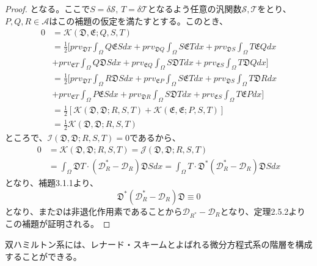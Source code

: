 \documentclass[a4paper, 11pt]{report}
\theoremstyle{definition}
\begin{document}
\begin{proof}
となる。ここで$S=\delta\mathcal{S}, \, T=\delta\mathcal{T}$となるよう任意の汎関数$\mathcal{S},\mathcal{T}$をとり、$P,Q,R\in\mathcal{A}$はこの補題の仮定を満たすとする。このとき、
\begin{align*}
0 &= \mathcal{K}(\mathfrak{D},\mathfrak{E};Q,S,T)\\
&= \frac{1}{2}[prv_{\mathfrak{D}T}\int_\Omega Q\mathfrak{E}Sdx + prv_{\mathfrak{D}Q}\int_\Omega S\mathfrak{E}Tdx + prv_{\mathfrak{D}S}\int_\Omega T\mathfrak{E}Qdx\\
&+ prv_{\mathfrak{E}T}\int_\Omega Q\mathfrak{D}Sdx + prv_{\mathfrak{E}Q}\int_\Omega S\mathfrak{D}Tdx + prv_{\mathfrak{E}S}\int_\Omega T\mathfrak{D}Qdx]\\
&= \frac{1}{2}[prv_{\mathfrak{D}T}\int_\Omega R\mathfrak{D}Sdx + prv_{\mathfrak{E}P}\int_\Omega S\mathfrak{E}Tdx + prv_{\mathfrak{D}S}\int_\Omega T\mathfrak{D}Rdx\\
&+ prv_{\mathfrak{E}T}\int_\Omega P\mathfrak{E}Sdx + prv_{\mathfrak{D}R}\int_\Omega S\mathfrak{D}Tdx + prv_{\mathfrak{E}S}\int_\Omega T\mathfrak{E}Pdx]\\
&= \frac{1}{2}[\mathcal{K}(\mathfrak{D},\mathfrak{D};R,S,T)+\mathcal{K}(\mathfrak{E},\mathfrak{E};P,S,T)]\\
&= \frac{1}{2}\mathcal{K}(\mathfrak{D},\mathfrak{D};R,S,T)
\end{align*}
ところで、$\mathcal{I}(\mathfrak{D},\mathfrak{D};R,S,T)=0$であるから、
\begin{align*}
0 &= \mathcal{K}(\mathfrak{D},\mathfrak{D};R,S,T) = \mathcal{J}(\mathfrak{D},\mathfrak{D};R,S,T)\\
&= \int_\Omega \mathfrak{D}T\cdot(\mathcal{D}_{R}^*-\mathcal{D}_R)\mathfrak{D}Sdx = \int_\Omega T\cdot\mathfrak{D}^*(\mathcal{D}_{R}^*-\mathcal{D}_R)\mathfrak{D}Sdx
\end{align*}
となり、補題3.1.1より、
\begin{equation*}
\mathfrak{D}^*(\mathcal{D}_{R}^*-\mathcal{D}_R)\mathfrak{D} \equiv 0
\end{equation*}
となり、また$\mathfrak{D}$は非退化作用素であることから$\mathcal{D}_{R^*}-\mathcal{D}_R$となり、定理2.5.2よりこの補題が証明される。
\end{proof}

 双ハミルトン系には、レナード・スキームとよばれる微分方程式系の階層を構成することができる。
\end{document}
